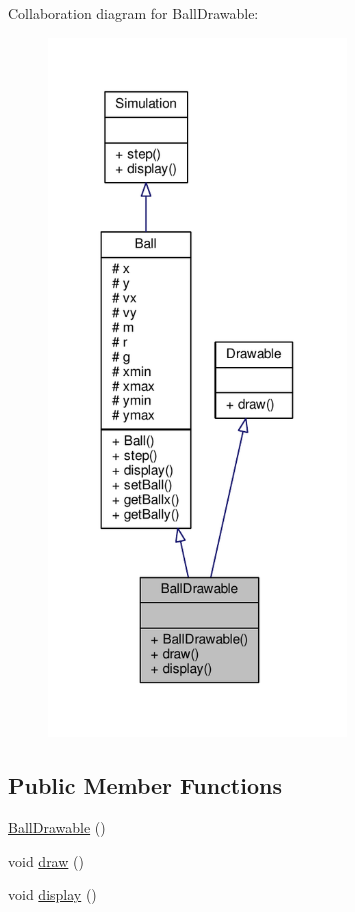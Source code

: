 Collaboration diagram for Ball\+Drawable\+:
\nopagebreak
\begin{figure}[H]
\begin{center}
\leavevmode
\includegraphics[width=224pt]{classBallDrawable__coll__graph}
\end{center}
\end{figure}
\subsection*{Public Member Functions}
\begin{DoxyCompactItemize}
\item 
\hyperlink{classBallDrawable_a50bda55f52c2ddbdf2bba8dde1471957}{Ball\+Drawable} ()
\item 
void \hyperlink{classBallDrawable_ae7cf6aaf513598338f14fc5c04bb7aed}{draw} ()
\item 
void \hyperlink{classBallDrawable_a934809e648474de989666d41a34a880e}{display} ()
\end{DoxyCompactItemize}
